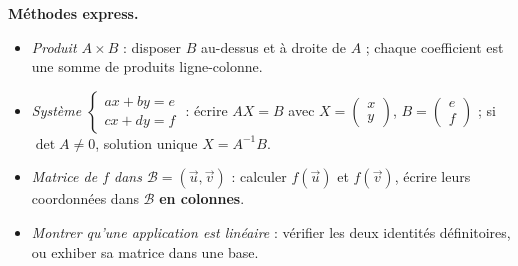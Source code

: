\documentclass[11pt]{article}
\begin{document}
\begin{aretenir}[L'essentiel de la le\c{c}on]
\textbf{M\'ethodes express.}
\begin{itemize}
  \item \emph{Produit $A\times B$} : disposer $B$ au-dessus et \`a droite de $A$ ; chaque coefficient est une somme de produits ligne-colonne.
  \item \emph{Syst\`eme $\begin{cases} ax+by=e \\ cx+dy=f \end{cases}$} : \'ecrire $AX=B$ avec $X=\begin{pmatrix} x \\ y \end{pmatrix}$, $B=\begin{pmatrix} e \\ f \end{pmatrix}$ ; si $\det A\neq 0$, solution unique $X=A^{-1}B$.
  \item \emph{Matrice de $f$ dans $\mathcal{B}=(\vec{u},\vec{v})$} : calculer $f(\vec{u})$ et $f(\vec{v})$, \'ecrire leurs coordonn\'ees dans $\mathcal{B}$ \textbf{en colonnes}.
  \item \emph{Montrer qu'une application est lin\'eaire} : v\'erifier les deux identit\'es d\'efinitoires, ou exhiber sa matrice dans une base.
\end{itemize}
\end{aretenir}
\end{document}
